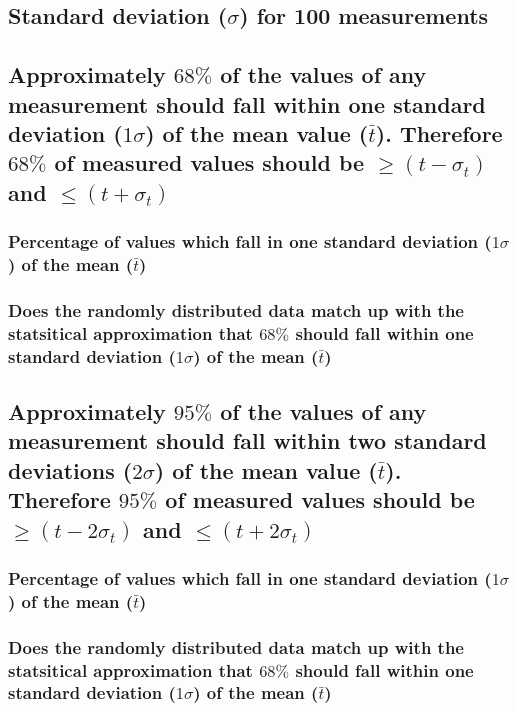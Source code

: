 \documentclass[11pt, letterpaper, includehead]{article}
\begin{document}
  \subsection{Standard deviation ($\sigma$) for 100 measurements} %

  \subsection{Approximately $68\%$ of the values of any measurement should fall within one 
  standard deviation ($1 \sigma$) of the mean value ($\bar{t}$). Therefore $68\%$ of measured 
  values should be $\geq (t - \sigma_t)$ and $\leq (t + \sigma_t)$} %

  \subsubsection{Percentage of values which fall in one standard deviation 
  ($1\sigma$) of the mean ($\bar{t}$)}

  \subsubsection{Does the randomly distributed data match up with the statsitical approximation
  that $68\%$ should fall within one standard deviation ($1\sigma$) of the mean ($\bar{t}$)}

  \subsection{Approximately $95\%$ of the values of any measurement should fall within two 
  standard deviations ($2 \sigma$) of the mean value ($\bar{t}$). Therefore $95\%$ of measured 
  values should be $\geq (t - 2 \sigma_t)$ and $\leq (t + 2 \sigma_t)$} %

  \subsubsection{Percentage of values which fall in one standard deviation 
  ($1\sigma$) of the mean ($\bar{t}$)}

  \subsubsection{Does the randomly distributed data match up with the statsitical approximation
  that $68\%$ should fall within one standard deviation ($1\sigma$) of the mean ($\bar{t}$)}
\end{document}
